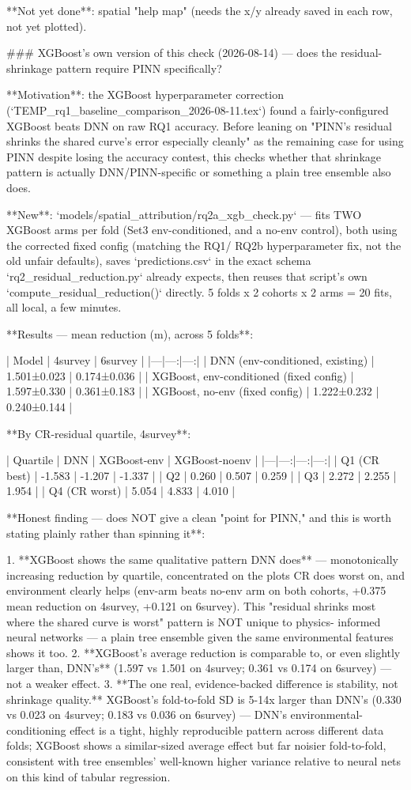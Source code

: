 **Not yet done**: spatial "help map" (needs the x/y already saved in each row, not yet plotted).

### XGBoost's own version of this check (2026-08-14) — does the residual-shrinkage pattern require PINN specifically?

**Motivation**: the XGBoost hyperparameter correction (`TEMP_rq1_baseline_comparison_2026-08-11.tex`)
found a fairly-configured XGBoost beats DNN on raw RQ1 accuracy. Before leaning on "PINN's residual
shrinks the shared curve's error especially cleanly" as the remaining case for using PINN despite
losing the accuracy contest, this checks whether that shrinkage pattern is actually
DNN/PINN-specific or something a plain tree ensemble also does.

**New**: `models/spatial_attribution/rq2a_xgb_check.py` — fits TWO XGBoost arms per fold (Set3
env-conditioned, and a no-env control), both using the corrected fixed config (matching the RQ1/
RQ2b hyperparameter fix, not the old unfair defaults), saves `predictions.csv` in the exact schema
`rq2_residual_reduction.py` already expects, then reuses that script's own
`compute_residual_reduction()` directly. 5 folds x 2 cohorts x 2 arms = 20 fits, all local, a few
minutes.

**Results — mean reduction (m), across 5 folds**:

| Model | 4survey | 6survey |
|---|---:|---:|
| DNN (env-conditioned, existing) | 1.501±0.023 | 0.174±0.036 |
| XGBoost, env-conditioned (fixed config) | 1.597±0.330 | 0.361±0.183 |
| XGBoost, no-env (fixed config) | 1.222±0.232 | 0.240±0.144 |

**By CR-residual quartile, 4survey**:

| Quartile | DNN | XGBoost-env | XGBoost-noenv |
|---|---:|---:|---:|
| Q1 (CR best) | -1.583 | -1.207 | -1.337 |
| Q2 | 0.260 | 0.507 | 0.259 |
| Q3 | 2.272 | 2.255 | 1.954 |
| Q4 (CR worst) | 5.054 | 4.833 | 4.010 |

**Honest finding — does NOT give a clean "point for PINN," and this is worth stating plainly
rather than spinning it**:

1. **XGBoost shows the same qualitative pattern DNN does** — monotonically increasing reduction by
   quartile, concentrated on the plots CR does worst on, and environment clearly helps (env-arm
   beats no-env arm on both cohorts, +0.375 mean reduction on 4survey, +0.121 on 6survey). This
   "residual shrinks most where the shared curve is worst" pattern is NOT unique to physics-
   informed neural networks — a plain tree ensemble given the same environmental features shows it
   too.
2. **XGBoost's average reduction is comparable to, or even slightly larger than, DNN's** (1.597 vs
   1.501 on 4survey; 0.361 vs 0.174 on 6survey) — not a weaker effect.
3. **The one real, evidence-backed difference is stability, not shrinkage quality.** XGBoost's
   fold-to-fold SD is 5-14x larger than DNN's (0.330 vs 0.023 on 4survey; 0.183 vs 0.036 on
   6survey) — DNN's environmental-conditioning effect is a tight, highly reproducible pattern
   across different data folds; XGBoost shows a similar-sized average effect but far noisier
   fold-to-fold, consistent with tree ensembles' well-known higher variance relative to neural
   nets on this kind of tabular regression.

